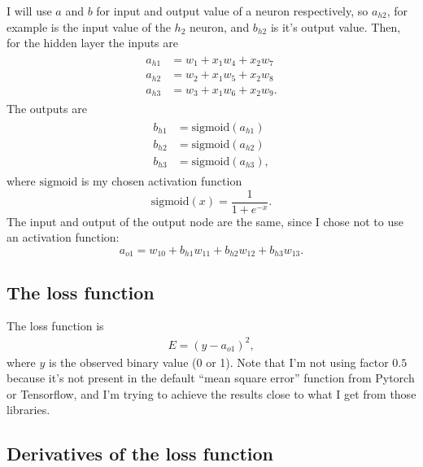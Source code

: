 I will use $a$ and $b$ for input and output value of a neuron respectively, so $a_{h2}$, for example is the input value of the $h_2$ neuron, and $b_{h2}$ is it's output value. Then, for the hidden layer the inputs are
\begin{align}
  \label{eq_q1_hidden_neurons_inputs}
  \begin{split}
    a_{h1} &= w_1 + x_1 w_4 + x_2 w_7 \\
    a_{h2} &= w_2 + x_1 w_5 + x_2 w_8 \\
    a_{h3} &= w_3 + x_1 w_6 + x_2 w_9.
  \end{split}
\end{align}
The outputs are
\begin{align}
  \label{eq_q1_hidden_neurons_outputs}
  \begin{split}
    b_{h1} &= \text{sigmoid}(a_{h1}) \\
    b_{h2} &= \text{sigmoid}(a_{h2}) \\
    b_{h3} &= \text{sigmoid}(a_{h3}),
  \end{split}
\end{align}
where $\text{sigmoid}$ is my chosen activation function
\[
\text{sigmoid}(x) = \frac{1}{1 + e^{-x}}.
\]
The input and output of the output node are the same, since I chose not to use an activation function:
\begin{equation}
  a_{o1} = w_{10} + b_{h1} w_{11} + b_{h2} w_{12} + b_{h3} w_{13}.
  \label{eq_q1_output_value}
\end{equation}


\subsection{The loss function}

The loss function is
\begin{align}
  E = (y - a_{o1})^2,
  \label{eq_q1_loss_function}
\end{align}
where $y$ is the observed binary value (0 or 1). Note that I'm not using factor $0.5$ because it's not present in the default ``mean square error'' function from Pytorch or Tensorflow, and I'm trying to achieve the results close to what I get from those libraries.


\subsection{Derivatives of the loss function}

